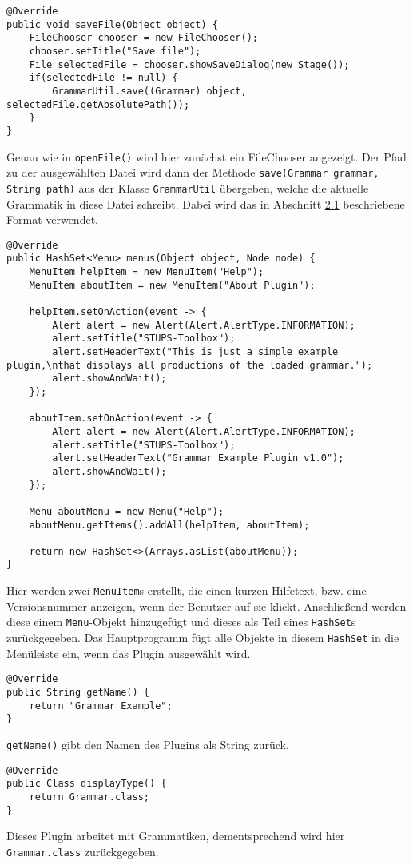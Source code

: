 \begin{lstlisting}[frame=single, basicstyle=\small, caption=Die Methode \textit{saveFile}]
@Override
public void saveFile(Object object) {
	FileChooser chooser = new FileChooser();
	chooser.setTitle("Save file");
	File selectedFile = chooser.showSaveDialog(new Stage());
	if(selectedFile != null) {
		GrammarUtil.save((Grammar) object, selectedFile.getAbsolutePath());
	}
}
\end{lstlisting}
Genau wie in \lstinline[columns=fixed]{openFile()} wird hier zunächst ein FileChooser angezeigt. Der Pfad zu der ausgewählten Datei wird dann der Methode \lstinline[columns=fixed]{save(Grammar grammar, String path)} aus der Klasse \lstinline[columns=fixed]{GrammarUtil} übergeben, welche die aktuelle Grammatik in diese Datei schreibt. Dabei wird das in Abschnitt \hyperref[sec:2.1]{2.1} beschriebene Format verwendet.
\begin{lstlisting}[frame=single, basicstyle=\small, caption=Die Methode \textit{menus}]
@Override
public HashSet<Menu> menus(Object object, Node node) {
	MenuItem helpItem = new MenuItem("Help");
	MenuItem aboutItem = new MenuItem("About Plugin");
	
	helpItem.setOnAction(event -> {
		Alert alert = new Alert(Alert.AlertType.INFORMATION);
		alert.setTitle("STUPS-Toolbox");
		alert.setHeaderText("This is just a simple example plugin,\nthat displays all productions of the loaded grammar.");
		alert.showAndWait();
	});
	
	aboutItem.setOnAction(event -> {
		Alert alert = new Alert(Alert.AlertType.INFORMATION);
		alert.setTitle("STUPS-Toolbox");
		alert.setHeaderText("Grammar Example Plugin v1.0");
		alert.showAndWait();
	});
	
	Menu aboutMenu = new Menu("Help");
	aboutMenu.getItems().addAll(helpItem, aboutItem);
	
	return new HashSet<>(Arrays.asList(aboutMenu));
}
\end{lstlisting}
Hier werden zwei \lstinline[columns=fixed]{MenuItem}s erstellt, die einen kurzen Hilfetext, bzw. eine Versionsnummer anzeigen, wenn der Benutzer auf sie klickt. Anschließend werden diese einem \lstinline[columns=fixed]{Menu}-Objekt hinzugefügt und dieses als Teil eines \lstinline[columns=fixed]{HashSet}s zurückgegeben. Das Hauptprogramm fügt alle Objekte in diesem \lstinline[columns=fixed]{HashSet} in die Menüleiste ein, wenn das Plugin ausgewählt wird.
\begin{lstlisting}[frame=single, basicstyle=\small, caption=Die Methode \textit{getName}]
@Override
public String getName() {
	return "Grammar Example";
}
\end{lstlisting}
\lstinline[columns=fixed]{getName()} gibt den Namen des Plugins als String zurück.
\begin{lstlisting}[frame=single, basicstyle=\small, caption=Die Methode \textit{displayType}]
@Override
public Class displayType() {
	return Grammar.class;
}
\end{lstlisting}
Dieses Plugin arbeitet mit Grammatiken, dementsprechend wird hier \lstinline[columns=fixed]{Grammar.class} zurückgegeben.

